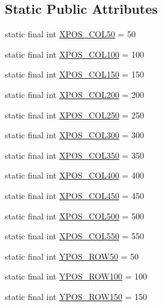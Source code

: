 \subsection*{Static Public Attributes}
\begin{DoxyCompactItemize}
\item 
static final int \hyperlink{class_display_1_1_display_a044af84b350b1be71c612ab3b534e24d}{X\+P\+O\+S\+\_\+\+C\+O\+L50} = 50
\item 
static final int \hyperlink{class_display_1_1_display_a0a8b9027490d3aa7d66834c6c12c0d35}{X\+P\+O\+S\+\_\+\+C\+O\+L100} = 100
\item 
static final int \hyperlink{class_display_1_1_display_abc29a83a5afef24b6775c0c867d5ca2e}{X\+P\+O\+S\+\_\+\+C\+O\+L150} = 150
\item 
static final int \hyperlink{class_display_1_1_display_adbcb46204650409d834ab66950cdc370}{X\+P\+O\+S\+\_\+\+C\+O\+L200} = 200
\item 
static final int \hyperlink{class_display_1_1_display_a9bc5732eb1a6077901a5e66984ffa339}{X\+P\+O\+S\+\_\+\+C\+O\+L250} = 250
\item 
static final int \hyperlink{class_display_1_1_display_a37098506cf494cbf79cc2ca5e88cd3ac}{X\+P\+O\+S\+\_\+\+C\+O\+L300} = 300
\item 
static final int \hyperlink{class_display_1_1_display_ac0e291caffea8a2d26755c36464c8418}{X\+P\+O\+S\+\_\+\+C\+O\+L350} = 350
\item 
static final int \hyperlink{class_display_1_1_display_a2b04669828dc32ce7435f60985fb9e15}{X\+P\+O\+S\+\_\+\+C\+O\+L400} = 400
\item 
static final int \hyperlink{class_display_1_1_display_aaa4a147d3ae20ff69293868c15b0810c}{X\+P\+O\+S\+\_\+\+C\+O\+L450} = 450
\item 
static final int \hyperlink{class_display_1_1_display_a8fafcc6bf1485ea9d420d3ec725472a7}{X\+P\+O\+S\+\_\+\+C\+O\+L500} = 500
\item 
static final int \hyperlink{class_display_1_1_display_a50de34dab11aef2aa13d782d088deb7d}{X\+P\+O\+S\+\_\+\+C\+O\+L550} = 550
\item 
static final int \hyperlink{class_display_1_1_display_abfcff615e1843cea5f5f5236f7270469}{Y\+P\+O\+S\+\_\+\+R\+O\+W50} = 50
\item 
static final int \hyperlink{class_display_1_1_display_ab910e7da741fb624b211994905f5a1ec}{Y\+P\+O\+S\+\_\+\+R\+O\+W100} = 100
\item 
static final int \hyperlink{class_display_1_1_display_a38a83d9cebcb54826379194267a2ab4a}{Y\+P\+O\+S\+\_\+\+R\+O\+W150} = 150

\end{DoxyCompactItemize}
